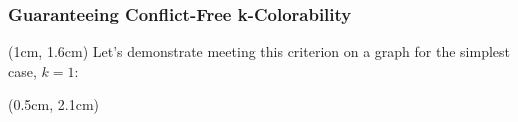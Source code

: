 \documentclass[xcolor=dvipsnames,aspectratio=1610]{beamer}
\newcommand{\examplewidth}{16cm}
\begin{document}
  \begin{frame}
    \frametitle{Guaranteeing Conflict-Free k-Colorability}





    \begin{textblock*}{14cm}(1cm, 1.6cm) %
      Let's demonstrate meeting this criterion on a graph for the simplest case, $k=1$:
    \end{textblock*}


    \begin{textblock*}{15cm}(0.5cm, 2.1cm) %


\end{textblock*}
\end{frame}
\end{document}
